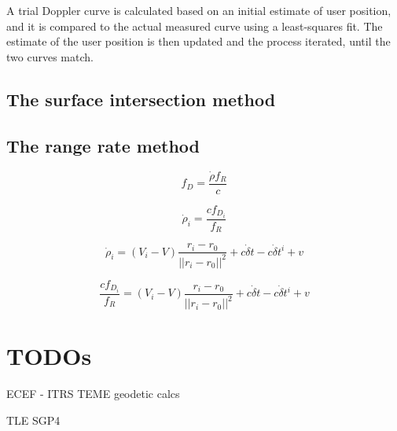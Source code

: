 A trial Doppler curve is calculated based on an initial estimate of user position, and it is compared to the actual measured curve using a least-squares fit. The estimate of the user position is then updated and the process iterated, until the two curves match\cite{sat16}.


\subsection{The surface intersection method}


\subsection{The range rate method}

\begin{equation}
    f_D = \frac{\dot\rho f_R}{c}
\end{equation}

\begin{equation}
    \dot\rho_i = \frac{c f_{D_i}}{f_R}
\end{equation}

\begin{equation}
    \dot\rho_i = (V_i - V) \frac{r_i - r_0}{||r_i - r_0||^2} + c \dot\delta t - c \dot \delta t^i + v
\end{equation}


\begin{equation}
    \frac{c f_{D_i}}{f_R} = (V_i - V) \frac{r_i - r_0}{||r_i - r_0||^2} + c \dot\delta t - c \dot \delta t^i + v
\end{equation}


\section{TODOs}
ECEF - ITRS \label{s_pos_frames_of_ref}
TEME
geodetic calcs 

TLE \label{s_pos_tle} 
SGP4 \label{s_pos_sgp4}
